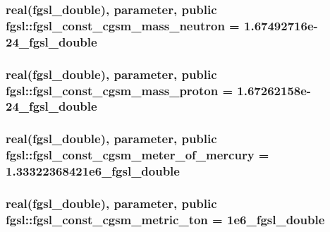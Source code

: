 \hypertarget{classfgsl_aa4c1d627604e0ff04d68a92847dc1a00}{
\subsubsection[{fgsl\-\_\-const\-\_\-cgsm\-\_\-mass\-\_\-neutron}]{\setlength{\rightskip}{0pt plus 5cm}real({\bf fgsl\-\_\-double}), parameter, public fgsl\-::fgsl\-\_\-const\-\_\-cgsm\-\_\-mass\-\_\-neutron = 1.\-67492716e-\/24\-\_\-fgsl\-\_\-double}}\label{classfgsl_aa4c1d627604e0ff04d68a92847dc1a00}
\hypertarget{classfgsl_aefda043fac3adf36e5c9142193d24ef6}{
\subsubsection[{fgsl\-\_\-const\-\_\-cgsm\-\_\-mass\-\_\-proton}]{\setlength{\rightskip}{0pt plus 5cm}real({\bf fgsl\-\_\-double}), parameter, public fgsl\-::fgsl\-\_\-const\-\_\-cgsm\-\_\-mass\-\_\-proton = 1.\-67262158e-\/24\-\_\-fgsl\-\_\-double}}\label{classfgsl_aefda043fac3adf36e5c9142193d24ef6}
\hypertarget{classfgsl_aa8fef1711fbb6768c4d9f7061e85b117}{
\subsubsection[{fgsl\-\_\-const\-\_\-cgsm\-\_\-meter\-\_\-of\-\_\-mercury}]{\setlength{\rightskip}{0pt plus 5cm}real({\bf fgsl\-\_\-double}), parameter, public fgsl\-::fgsl\-\_\-const\-\_\-cgsm\-\_\-meter\-\_\-of\-\_\-mercury = 1.\-33322368421e6\-\_\-fgsl\-\_\-double}}\label{classfgsl_aa8fef1711fbb6768c4d9f7061e85b117}
\hypertarget{classfgsl_a6d4725a1ee32c2bf1dcd4aa1d2e00908}{
\subsubsection[{fgsl\-\_\-const\-\_\-cgsm\-\_\-metric\-\_\-ton}]{\setlength{\rightskip}{0pt plus 5cm}real({\bf fgsl\-\_\-double}), parameter, public fgsl\-::fgsl\-\_\-const\-\_\-cgsm\-\_\-metric\-\_\-ton = 1e6\-\_\-fgsl\-\_\-double}}\label{classfgsl_a6d4725a1ee32c2bf1dcd4aa1d2e00908}

